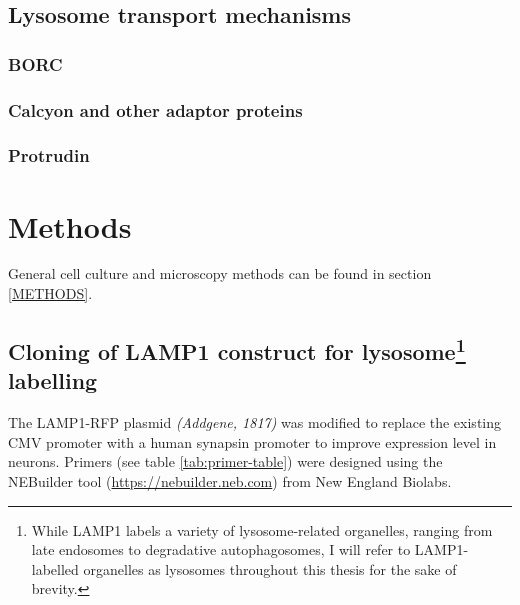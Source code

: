 \documentclass[
]{book}
\begin{document}
\hypertarget{lysosome-transport-mechanisms}{%
\subsection{Lysosome transport mechanisms}\label{lysosome-transport-mechanisms}}

\hypertarget{borc}{%
\subsubsection{BORC}\label{borc}}

\hypertarget{calcyon-and-other-adaptor-proteins}{%
\subsubsection{Calcyon and other adaptor proteins}\label{calcyon-and-other-adaptor-proteins}}

\hypertarget{protrudin}{%
\subsubsection{Protrudin}\label{protrudin}}

\hypertarget{methods}{%
\section{Methods}\label{methods}}

General cell culture and microscopy methods can be found in section \ref{METHODS}.

\hypertarget{cloning-of-lamp1-construct-for-lysosome-labelling}{%
\subsection[Cloning of LAMP1 construct for lysosome labelling]{\texorpdfstring{Cloning of LAMP1 construct for lysosome\footnote{While LAMP1 labels a variety of lysosome-related organelles, ranging from late endosomes to degradative autophagosomes, I will refer to LAMP1-labelled organelles as lysosomes throughout this thesis for the sake of brevity.} labelling}{Cloning of LAMP1 construct for lysosome labelling}}\label{cloning-of-lamp1-construct-for-lysosome-labelling}}

The LAMP1-RFP plasmid \emph{(Addgene, 1817)} was modified to replace the existing CMV promoter with a human synapsin promoter to improve expression level in neurons. Primers (see table \ref{tab:primer-table}) were designed using the NEBuilder tool (\url{https://nebuilder.neb.com}) from New England Biolabs.
\end{document}
